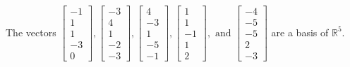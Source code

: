 \begin{exercise}
\begin{exerciseStatement}
  \end{exerciseStatement}
  \begin{exerciseAnswer}
   The vectors \(\left[\begin{array}{r}
-1 \\
1 \\
1 \\
-3 \\
0
\end{array}\right] , \left[\begin{array}{r}
-3 \\
4 \\
1 \\
-2 \\
-3
\end{array}\right] , \left[\begin{array}{r}
4 \\
-3 \\
1 \\
-5 \\
-1
\end{array}\right] , \left[\begin{array}{r}
1 \\
1 \\
-1 \\
1 \\
2
\end{array}\right] , \text{ and } \left[\begin{array}{r}
-4 \\
-5 \\
-5 \\
2 \\
-3
\end{array}\right]\) 
  	 are  a basis of \(\mathbb{R}^5\).
  


  \end{exerciseAnswer}
\end{exercise}